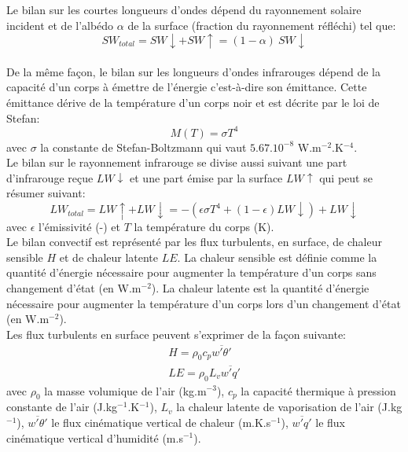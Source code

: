 \noindent Le bilan sur les courtes longueurs d'ondes dépend du rayonnement solaire incident et de l'albédo $\alpha$ de la surface (fraction du rayonnement réfléchi) tel que: \begin{equation}
SW_{total} = SW\downarrow + SW\uparrow = (1-\alpha) \: SW\downarrow
\end{equation}
\\
De la même façon, le bilan sur les longueurs d'ondes infrarouges dépend de la capacité d'un corps à émettre de l'énergie c'est-à-dire son émittance. Cette émittance dérive de la température d'un corps noir et est décrite par le loi de Stefan: 
\begin{equation}
M(T) = \sigma T^{4}
\end{equation}
avec $\sigma$ la constante de Stefan-Boltzmann qui vaut $5.67.10^{-8}$ W.m$^{-2}$.K$^{-4}$. \\

\noindent Le bilan sur le rayonnement infrarouge se divise aussi suivant une part d'infrarouge reçue $LW\downarrow$ et une part émise par la surface $LW\uparrow$ qui peut se résumer suivant:
\begin{equation}
LW_{total} = LW\uparrow + LW\downarrow = -\left(\epsilon \sigma T^{4} + (1-\epsilon)LW\downarrow \right) + LW\downarrow
\end{equation}
avec $\epsilon$ l'émissivité (-) et $T$ la température du corps (K).
\\

\noindent Le bilan convectif est représenté par les flux turbulents, en surface, de chaleur sensible $H$ et de chaleur latente $LE$. La chaleur sensible est définie comme la quantité d'énergie nécessaire pour augmenter la température d'un corps sans changement d'état (en W.m$^{-2}$). La chaleur latente est la quantité d'énergie nécessaire pour augmenter la température d'un corps lors d'un changement d'état (en W.m$^{-2}$).\\
Les flux turbulents en surface peuvent s'exprimer de la façon suivante:
\begin{align}
H  = \rho_{0}c_{p}\overline{w'\theta'}
\\
LE = \rho_{0}L_{v}\overline{w'q'}
\end{align}
avec $\rho_{0}$ la masse volumique de l'air (kg.m$^{-3}$), $c_{p}$ la capacité thermique à pression constante de l'air (J.kg$^{-1}$.K$^{-1}$), $L_{v}$ la chaleur latente de vaporisation de l'air (J.kg$^{-1}$), $\overline{w'\theta'}$ le flux cinématique vertical de chaleur (m.K.s$^{-1}$), $\overline{w'q'}$ le flux cinématique vertical d'humidité (m.s$^{-1}$).
\\

